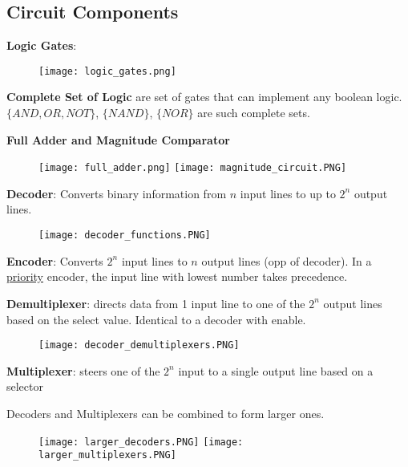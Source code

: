 \documentclass[a4paper,landscape]{article}
\newcommand{\rntopic}[1]{\vspace{-2.0em}\subsection*{#1}\vspace{-1.0em}}
\newcommand{\rnname}[1]{\textbf{#1}}
\begin{document}
\begin{multicols*}{4}
\rntopic{Circuit Components}
\begin{flatitemize}
\item \rnname{Logic Gates}:
\vspace{-1em}
\begin{figure}[H]
  \texttt{[image: logic\_gates.png]}
\end{figure}
\vspace{-1.5em}
\item \rnname{Complete Set of Logic} are set of gates that can implement any boolean logic. $\lbrace AND, OR, NOT\rbrace$, $\lbrace NAND \rbrace$, $\lbrace NOR \rbrace$ are such complete sets.
\item \rnname{Full Adder and Magnitude Comparator}
\vspace{-1em}
\begin{figure}[H]
  \texttt{[image: full\_adder.png]}
  \texttt{[image: magnitude\_circuit.PNG]}
\end{figure}
\vspace{-1.5em}
\item \rnname{Decoder}: Converts binary information from $n$ input lines to up to $2^n$ output lines.
\vspace{-1em}
\begin{figure}[H]
  \texttt{[image: decoder\_functions.PNG]}
\end{figure}
\vspace{-1.5em}
\item \rnname{Encoder}: Converts $2^n$ input lines to $n$ output lines (opp of decoder). In a \underline{priority} encoder, the input line with lowest number takes precedence.

\item \rnname{Demultiplexer}: directs data from 1 input line to one of the $2^n$ output lines based on the select value. Identical to a decoder with enable.
\vspace{-1em}
\begin{figure}[H]
  \texttt{[image: decoder\_demultiplexers.PNG]}
\end{figure}
\vspace{-1.5em}

\item \rnname{Multiplexer}: steers one of the $2^n$ input to a single output line based on a selector
\item Decoders and Multiplexers can be combined to form larger ones.
\vspace{-1.5em}
\begin{figure}[H]
  \texttt{[image: larger\_decoders.PNG]}
  \texttt{[image: larger\_multiplexers.PNG]}
\end{figure}
\vspace{-1.5em}





\end{flatitemize}
\end{multicols*}
\end{document}
